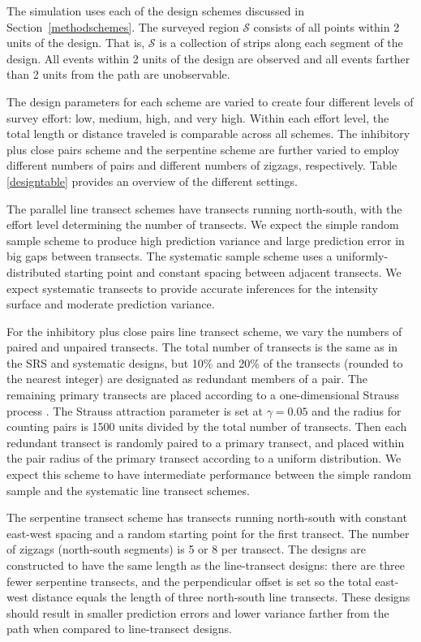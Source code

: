 \documentclass[review]{elsarticle}
\begin{document}
The simulation uses each of the design schemes discussed in
Section~\ref{methodschemes}. The surveyed region \(\mathcal{S}\) consists of
all points within 2 units of the design. That is, \(\mathcal{S}\) is a
collection of strips along each segment of the design. All events within 2
units of the design are observed and all events farther than 2 units from
the path are unobservable.

The design parameters for each scheme are varied to create four different
levels of survey effort: low, medium, high, and very high. Within each effort
level, the total length or distance traveled is comparable across all schemes.
The inhibitory plus close pairs scheme and the serpentine scheme are further
varied to employ different numbers of pairs and different numbers of zigzags,
respectively. Table \ref{designtable} provides an overview of the different
settings.

The parallel line transect schemes have transects running north-south, with
the effort level determining the number of transects. We expect the simple
random sample scheme to produce high prediction variance and large prediction
error in big gaps between transects. The systematic sample scheme uses a
uniformly-distributed starting point and constant spacing between adjacent
transects. We expect systematic transects to provide accurate inferences for
the intensity surface and moderate prediction variance.%

For the inhibitory plus close pairs line transect scheme, we vary the numbers of
paired and unpaired transects. The total number of transects is the same as in
the SRS and systematic designs, but 10\% and 20\% of the transects (rounded to
the nearest integer) are designated as redundant members of a pair. The
remaining primary transects are placed according to a one-dimensional Strauss
process \citep{strauss,kellyripley}. The Strauss attraction parameter is set
at \(\gamma = 0.05\) and the radius for counting pairs is 1500 units divided
by the total number of transects. Then each redundant transect is randomly
paired to a primary transect, and placed within the pair radius of the primary
transect according to a uniform distribution. We expect this scheme to have
intermediate performance between the simple random sample and the systematic
line transect schemes.

The serpentine transect scheme has transects running north-south with constant
east-west spacing and a random starting point for the first transect. The
number of zigzags (north-south segments) is 5 or 8 per transect. The designs
are constructed to have the same length as the line-transect designs: there are
three fewer serpentine transects, and the perpendicular offset is set so the
total east-west distance equals the length of three north-south line transects.
These designs should result in smaller prediction errors and lower variance
farther from the path when compared to line-transect designs.
\end{document}
